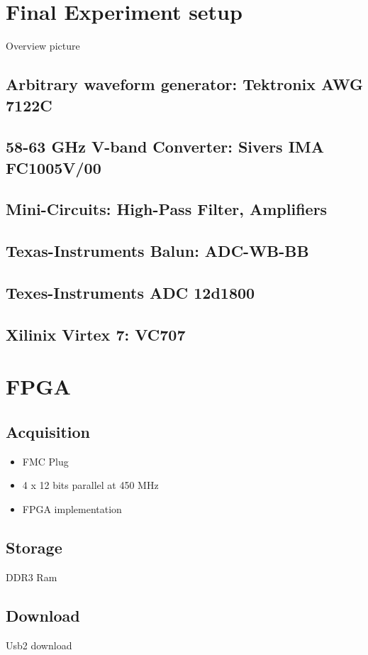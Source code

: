 \section{Final Experiment setup}
Overview picture

\subsection{Arbitrary waveform generator: Tektronix AWG 7122C}
\subsection{58-63 GHz V-band Converter: Sivers IMA FC1005V/00}
\subsection{Mini-Circuits: High-Pass Filter, Amplifiers}
\subsection{Texas-Instruments Balun: ADC-WB-BB}
\subsection{Texes-Instruments ADC 12d1800}
\subsection{Xilinix Virtex 7: VC707}

\section{FPGA}
\subsection{Acquisition}
\begin{itemize}
\item FMC Plug
\item 4 x 12 bits parallel at 450 MHz
\item FPGA implementation
\end{itemize}

\subsection{Storage}
DDR3 Ram

\subsection{Download}
Usb2 download

